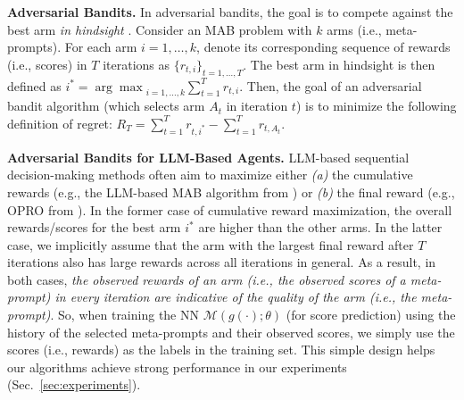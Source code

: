 \textbf{Adversarial Bandits.}
In adversarial bandits, the goal is to compete against the best arm \emph{in hindsight} \cite{lattimore2020bandit}. 
Consider an MAB problem with $k$ arms (i.e., meta-prompts).
For each arm $i=1,\ldots,k$, denote its corresponding sequence of rewards (i.e., scores) in $T$ iterations as $\{r_{t,i}\}_{t=1,\ldots,T}$.
The best arm in hindsight is then defined as $i^*={\arg\max}_{i=1,\ldots,k}\sum^T_{t=1} r_{t,i}$.
Then, the goal of an adversarial bandit algorithm (which selects arm $A_t$ in iteration $t$) is to minimize the following definition of regret: $R_T=\sum^T_{t=1} r_{t,i^*} - \sum^T_{t=1} r_{t,A_t}$.

\textbf{Adversarial Bandits for LLM-Based Agents.}
LLM-based sequential decision-making methods often aim to maximize either \emph{(a)} the cumulative rewards 
(e.g., the LLM-based MAB algorithm from \citet{krishnamurthy2024can}) 
or \emph{(b)} the final reward (e.g., OPRO from \citet{yang2023large}).
In the former case of cumulative reward maximization, 
the overall rewards/scores for the best arm $i^*$ are higher than the other arms.
In the latter case, we implicitly assume that
the arm with the largest final reward after $T$ iterations also has large rewards across all iterations in general.
As a result, in both cases, \emph{the observed rewards of an arm (i.e., the observed scores of a meta-prompt) in every iteration are indicative of the quality of the arm (i.e., the meta-prompt)}.
So, when training the NN $\mathcal{M}(g(\cdot); \theta)$ (for score prediction) using the history of the selected meta-prompts and their observed scores, we simply use the scores (i.e., rewards) as the labels in the training set.
This simple design helps our algorithms achieve strong performance in our experiments (Sec.~\ref{sec:experiments}).

